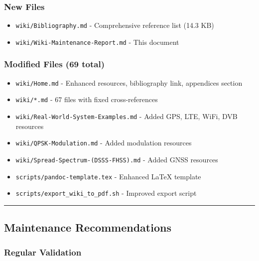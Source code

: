 \subsubsection{New Files}\label{new-files}

\begin{itemize}
\tightlist
\item
  \texttt{wiki/Bibliography.md} - Comprehensive reference list (14.3 KB)
\item
  \texttt{wiki/Wiki-Maintenance-Report.md} - This document
\end{itemize}

\subsubsection{Modified Files (69 total)}\label{modified-files-69-total}

\begin{itemize}
\tightlist
\item
  \texttt{wiki/Home.md} - Enhanced resources, bibliography link,
  appendices section
\item
  \texttt{wiki/*.md} - 67 files with fixed cross-references
\item
  \texttt{wiki/Real-World-System-Examples.md} - Added GPS, LTE, WiFi,
  DVB resources
\item
  \texttt{wiki/QPSK-Modulation.md} - Added modulation resources
\item
  \texttt{wiki/Spread-Spectrum-(DSSS-FHSS).md} - Added GNSS resources
\item
  \texttt{scripts/pandoc-template.tex} - Enhanced LaTeX template
\item
  \texttt{scripts/export\_wiki\_to\_pdf.sh} - Improved export script
\end{itemize}

\begin{center}\rule{0.5\linewidth}{0.5pt}\end{center}

\subsection{Maintenance
Recommendations}\label{maintenance-recommendations}

\subsubsection{Regular Validation}\label{regular-validation}

